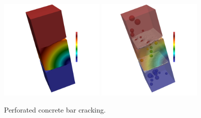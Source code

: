 \documentclass{report}
\begin{document}
\begin{figure}
    \centering
    \includegraphics[width=0.45\textwidth]{./Images/rainbow-test.png}    \includegraphics[width=0.45\textwidth]{./Images/rainbow-test1.png}
    \caption{Perforated concrete bar cracking.}
    \label{fig:rainbow}
\end{figure}
\end{document}
